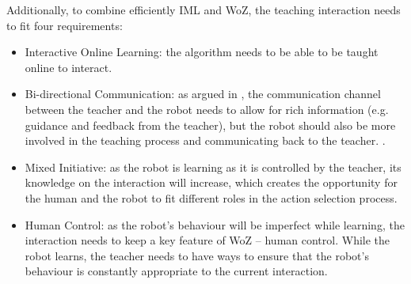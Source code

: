\documentclass[manuscript, review, anonymous]{acmart}
\newcommand{\ES}[1]{\added[id=ES]{#1}}
\begin{document}
Additionally, to combine efficiently IML and WoZ, the teaching interaction needs to fit four requirements:
\begin{itemize}
    \item Interactive Online Learning: the algorithm needs to be able to be taught online to interact.
    \item Bi-directional Communication: as argued in \cite{thomaz2008teachable}, the communication channel between the teacher and the robot needs to allow for rich information (e.g. guidance and
feedback from the teacher), but the robot should also be more involved in the
teaching process and communicating back to the teacher. 
\cite{munzer2017efficient,senft2015sparc}. 
    \item Mixed Initiative: as the robot is learning as it is controlled by the teacher, 
    its knowledge on the interaction will increase, which creates the opportunity for the human 
    and the robot to fit different roles in the action selection process.
    \item Human Control: as the robot's behaviour will be imperfect while learning, the interaction
    needs to keep a key feature of WoZ -- human control. While the robot learns, the teacher needs to have 
    ways to ensure that the robot's behaviour is constantly appropriate to the current interaction.
\end{itemize}
\end{document}
